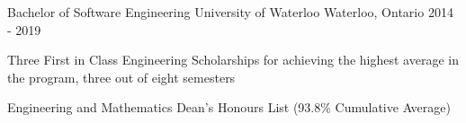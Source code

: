 \begin{cventries}
  \cventry
    {Bachelor of Software Engineering}
    {University of Waterloo}
    {Waterloo, Ontario}
    {2014 - 2019}
    {
      \begin{cvitems}
      \item Three First in Class Engineering Scholarships for achieving the highest average in the program, three out of eight semesters
      \item Engineering and Mathematics Dean’s Honours List (93.8\% Cumulative Average)
      \end{cvitems}
    }
\end{cventries}
